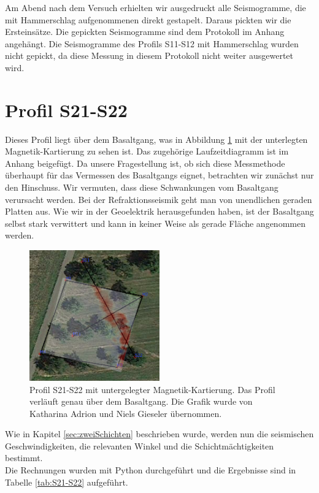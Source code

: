 Am Abend nach dem Versuch erhielten wir ausgedruckt alle Seismogramme, die mit Hammerschlag aufgenommenen direkt gestapelt. Daraus pickten wir die Ersteinsätze. Die gepickten Seismogramme sind dem Protokoll im Anhang angehängt. Die Seismogramme des Profils S11-S12 mit Hammerschlag wurden nicht gepickt, da diese Messung in diesem Protokoll nicht weiter ausgewertet wird.

\section{Profil S21-S22 }

Dieses Profil liegt über dem Basaltgang, was in Abbildung \ref{fig:Kartierung} mit der unterlegten Magnetik-Kartierung zu sehen ist. Das zugehörige Laufzeitdiagramm ist im Anhang beigefügt. Da unsere Fragestellung ist, ob sich diese Messmethode überhaupt für das Vermessen des Basaltgangs eignet, betrachten wir zunächst nur den Hinschuss. 
Wir vermuten, dass diese Schwankungen vom Basaltgang verursacht werden. Bei der Refraktionsseismik geht man von unendlichen geraden Platten aus. Wie wir in der Geoelektrik herausgefunden haben, ist der Basaltgang selbst stark verwittert und kann in keiner Weise als gerade Fläche angenommen werden.

\begin{figure}[!ht]
 \centering
 \includegraphics[width=0.5\textwidth]{fig/Seismik_kartierung}
 \caption[Profil S21-S22 mit untergelegter Magnetik-Kartierung]{Profil S21-S22 mit untergelegter Magnetik-Kartierung. Das Profil verläuft genau über dem Basaltgang. Die Grafik wurde von Katharina Adrion und Niels Gieseler übernommen.}
 \label{fig:Kartierung}
\end{figure}

Wie in Kapitel \ref{sec:zweiSchichten} beschrieben wurde, werden nun die seismischen Geschwindigkeiten, die relevanten Winkel und die Schichtmächtigkeiten bestimmt.\\
Die Rechnungen wurden mit Python durchgeführt und die Ergebnisse sind in Tabelle \ref{tab:S21-S22} aufgeführt.\\

